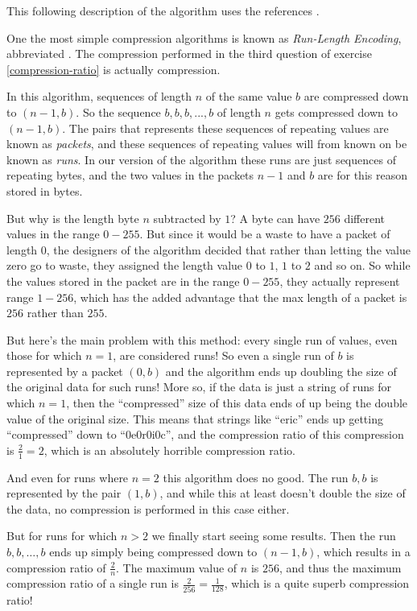 This following description of the \rle algorithm uses the references
\cite{nagarajan11:_enhan_approac_run_lengt_encod_schem,murray1996encyclopedia,mark1996data_compression_book}.

One the most simple compression algorithms is known as
\textit{Run-Length Encoding}, abbreviated \rle. The compression
performed in the third question of exercise \ref{compression-ratio} is
actually \rle compression.

In this algorithm, sequences of length $n$ of the same value $b$ are
compressed down to $(n-1,b)$. So the sequence $b,b,b,...,b$ of length
$n$ gets compressed down to $(n-1,b)$. The pairs that represents these
sequences of repeating values are known as \textit{packets}, and these
sequences of repeating values will from known on be known as
\textit{runs}. In our version of the \rle algorithm these runs are just
sequences of repeating bytes, and the two values in the packets $n-1$
and $b$ are for this reason stored in bytes.

But why is the length byte $n$ subtracted by $1$?  A byte can have
$256$ different values in the range $0-255$. But since it would be a
waste to have a packet of length $0$, the designers of the algorithm
decided that rather than letting the value zero go to waste, they
assigned the length value $0$ to $1$, $1$ to $2$ and so on. So while
the values stored in the packet are in the range $0-255$, they
actually represent range $1-256$, which has the added advantage that
the max length of a packet is $256$ rather than $255$.

But here's the main problem with this method: every single run of
values, even those for which $n=1$, are considered runs! So even a
single run of $b$ is represented by a packet $(0,b)$ and the algorithm
ends up doubling the size of the original data for such runs! More so,
if the data is just a string of runs for which $n=1$, then the
``compressed'' size of this data ends of up being the double value of
the original size. This means that strings like ``eric'' ends up
getting ``compressed'' down to ``0e0r0i0c'', and the compression ratio
of this compression is $\frac{2}{1} = 2$, which is an absolutely
horrible compression ratio.

And even for runs where $n=2$ this algorithm does no good. The run
$b,b$ is represented by the pair $(1,b)$, and while this at least
doesn't double the size of the data, no compression is performed in
this case either.

But for runs for which $n > 2$ we finally start seeing some
results. Then the run $b, b, \dots, b$ ends up simply being compressed
down to $(n-1,b)$, which results in a compression ratio of
$\frac{2}{n}$. The maximum value of $n$ is $256$, and thus the maximum
compression ratio of a single run is $\frac{2}{256} = \frac{1}{128}$,
which is a quite superb compression ratio!

